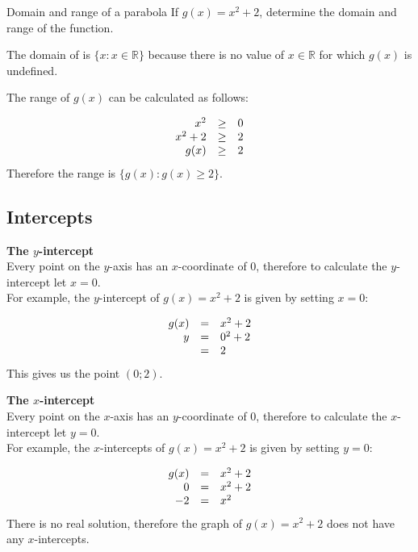 \begin{wex}{Domain and range of a parabola}
{If $g(x)={x}^{2}+2$, determine the domain and range of the function.}
{
The domain of  is $\{x:x\in \mathbb{R}\}$ because there is no value of $x\in \mathbb{R}$ for which $g(x)$ is undefined.

The range of $g(x)$ can be calculated as follows:

\begin{equation*}
\begin{array}{ccc}\hfill {x}^{2}& \ge & 0\hfill \\
 \hfill {x}^{2}+2& \ge & 2\hfill \\
 \hfill g(x)& \ge & 2\hfill 
\end{array}
\end{equation*}
Therefore the range is $\{g(x):g(x)\geq 2\}$.
}
\end{wex}



\subsection*{ Intercepts}
\textbf{The $y$-intercept}\\
Every point on the $y$-axis has an $x$-coordinate of $0$, therefore to calculate the $y$-intercept let $x=0$.\\

For example, the $y$-intercept of $g(x)={x}^{2}+2$ is given by setting $x=0$:\par 

\begin{equation*}
\begin{array}{ccl}\hfill g(x)& =& {x}^{2}+2\hfill \\ 
\hfill {y}& =& {0}^{2}+2\hfill \\
 & =& 2\hfill 
\end{array}
\end{equation*}
This gives us the point $(0;2)$.\par

\textbf{The $x$-intercept}\\
Every point on the $x$-axis has an $y$-coordinate of $0$, therefore to calculate the $x$-intercept let $y=0$.\\

For example, the $x$-intercepts of $g(x)={x}^{2}+2$ is given by setting $y=0$:\par

\begin{equation*}
\begin{array}{ccl}\hfill g(x)& =& {x}^{2}+2\hfill \\
 \hfill 0& =& x^{2}+2\hfill \\
 \hfill -2& =& x^{2}\hfill 
\end{array}
\end{equation*}
There is no real solution, therefore the graph of $g(x)={x}^{2}+2$ does not have any $x$-intercepts. 

